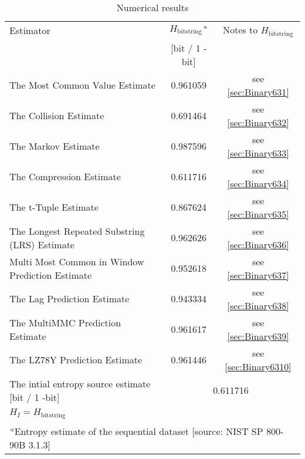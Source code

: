 \documentclass[a3paper,xelatex,english]{bxjsarticle}
\begin{document}
\begin{table}[h]
\caption{Numerical results}
\begin{center}
\begin{tabular}{|l|c|c|}
\hline 
\rowcolor{anotherlightblue} %
Estimator										& $H_{\textrm{bitstring}}$$^{\textrm{\,a}}$ & Notes to $H_{\textrm{bitstring}}$	\\ 
\cline{2-3}
\rowcolor{anotherlightblue} %
\,												& [bit / 1 - bit] & \,		\\
\hline 
The Most Common Value Estimate					& 0.961059& see \ref{sec:Binary631} \\
\hline 
The Collision Estimate							& 0.691464& see \ref{sec:Binary632} \\
\hline 
The Markov Estimate								& 0.987596& see \ref{sec:Binary633} \\
\hline 
The Compression Estimate						& 0.611716& see \ref{sec:Binary634} \\
\hline 
The t-Tuple Estimate							& 0.867624& see \ref{sec:Binary635} \\
\hline 
The Longest Repeated Substring (LRS) Estimate	& 0.962626& see \ref{sec:Binary636} \\
\hline 
Multi Most Common in Window Prediction Estimate	& 0.952618& see \ref{sec:Binary637} \\
\hline 
The Lag Prediction Estimate						& 0.943334& see \ref{sec:Binary638} \\
\hline 
The MultiMMC Prediction Estimate				& 0.961617& see \ref{sec:Binary639} \\
\hline 
The LZ78Y Prediction Estimate					& 0.961446& see \ref{sec:Binary6310} \\
\hline \hline 
The intial entropy source estimate [bit / 1 -bit]	& \multicolumn{2}{|c|}{0.611716}	\\
$H_{I} = H_{\textrm{bitstring}}$ & \multicolumn{2}{|c|}{ \, } 	\\
\hline \hline 
\multicolumn{3}{|l|}{$^{\,a}$\quad Entropy estimate of the sequential dataset [source: NIST SP 800-90B \cite{SP80090B} 3.1.3]} \\
\hline 
\end{tabular}
\end{center}
\end{table}
\end{document}
